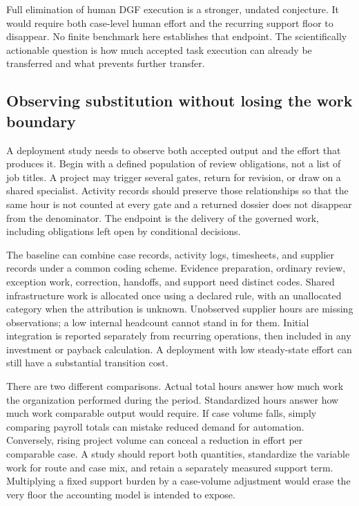 Full elimination of human DGF execution is a stronger, undated conjecture. It would require
both case-level human effort and the recurring support floor to disappear. No finite benchmark
here establishes that endpoint. The scientifically actionable question is how much accepted
task execution can already be transferred and what prevents further transfer.

\subsection{Observing substitution without losing the work boundary}

A deployment study needs to observe both accepted output and the effort that produces it.
Begin with a defined population of review obligations, not a list of job titles. A project
may trigger several gates, return for revision, or draw on a shared specialist. Activity
records should preserve those relationships so that the same hour is not counted at every
gate and a returned dossier does not disappear from the denominator. The endpoint is the
delivery of the governed work, including obligations left open by conditional decisions.

The baseline can combine case records, activity logs, timesheets, and supplier records under
a common coding scheme. Evidence preparation, ordinary review, exception work, correction,
handoffs, and support need distinct codes. Shared infrastructure work is allocated once using
a declared rule, with an unallocated category when the attribution is unknown. Unobserved
supplier hours are missing observations; a low internal headcount cannot stand in for them.
Initial integration is reported separately from recurring operations, then included in any
investment or payback calculation. A deployment with low steady-state effort can still have
a substantial transition cost.

There are two different comparisons. Actual total hours answer how much work the organization
performed during the period. Standardized hours answer how much work comparable output would
require. If case volume falls, simply comparing payroll totals can mistake reduced demand for
automation. Conversely, rising project volume can conceal a reduction in effort per comparable
case. A study should report both quantities, standardize the variable work for route and case
mix, and retain a separately measured support term. Multiplying a fixed support burden by a
case-volume adjustment would erase the very floor the accounting model is intended to expose.

